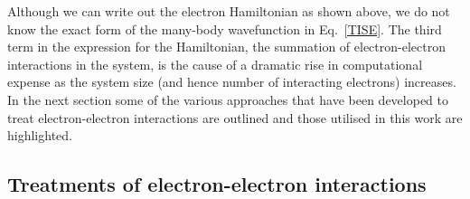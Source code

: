 \documentclass[11pt, twoside]{report}
\begin{document}
Although we can write out the electron Hamiltonian as shown above, we do not know the exact form of the many-body wavefunction in Eq.~\ref{TISE}. The third term in the expression for the Hamiltonian, the summation of electron-electron interactions in the system, is the cause of a dramatic rise in computational expense as the system size (and hence number of interacting electrons) increases. In the next section some of the various approaches that have been developed to treat electron-electron interactions are outlined and those utilised in this work are highlighted.


\subsection{Treatments of electron-electron interactions}
\end{document}
